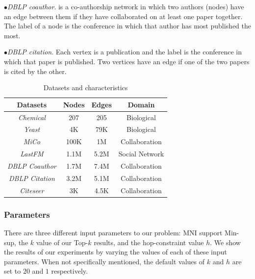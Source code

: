 $\bullet${\textit{DBLP coauthor}\cite{}}. is a co-authorship network in which two authors (nodes) have an edge between them if they have collaborated on at least one paper together. The label of a node is the conference in which that author has most published the most.%

$\bullet${\textit{DBLP citation}\cite{}}. Each vertex is a publication and the label is the conference in which that paper is published. Two vertices have an edge if one of the two papers is cited by the other. %
\begin{table}[tb!]
	\vspace{-2mm}
		\vspace{-1mm}
		\centering
		\caption{Datasets and characteristics\label{tab:datasets}}
		\vspace{-3mm}
{\scriptsize
		\begin{tabular} {cccc}
			\hline
			Datasets  & Nodes & Edges  & Domain\\			 
			\hline 
			{\em Chemical}   &   207    &  205   & Biological\\
			{\em Yeast}   &   4K    &  79K  & Biological\\
			{\em MiCo}   &   100K    &  1M   & Collaboration\\ 
			{\em LastFM}   &   1.1M   &  5.2M & Social Network\\
			{\em DBLP Coauthor}   &   1.7M    &  7.4M   & Collaboration\\ 
			{\em DBLP Citation}   &   3.2M   &  5.1M   & Collaboration\\
			{\em Citeseer}   &   3K   &  4.5K & Collaboration\\
			
			\hline
		\end{tabular}}
	\vspace{-4mm}
\end{table}


\subsubsection{Parameters} There are three different input parameters to our problem: MNI support {\sf Min-sup}, the $k$ value of our {\sf Top-$k$} results, and the hop-constraint value $h$. We show the results of our experiments by varying the values of each of these input parameters. When not specifically mentioned, the default values of $k$ and $h$ are set to $20$ and $1$ respectively. %

